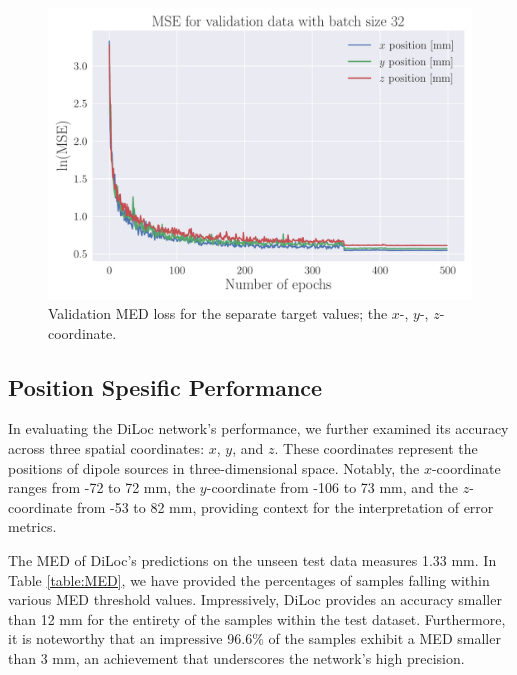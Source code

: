 \documentclass[a4paper, UKenglish, 11pt]{uiomaster}
\begin{document}
\begin{figure}[!htb]
    \centering
    \includegraphics[width=\linewidth]{figures/mse_targets_simple_32_0.001_0.35_0.5_0.0_500_(0).pdf}
    \caption{Validation MED loss for the separate target values; the $x$-, $y$-, $z$-coordinate.}
    \label{fig:single_dipole_accuracy_targets}
\end{figure}


\subsection{Position Spesific Performance}
In evaluating the DiLoc network's performance, we further examined its accuracy across three spatial coordinates: $x$, $y$, and $z$. These coordinates represent the positions of dipole sources in three-dimensional space. Notably, the $x$-coordinate ranges from -72 to 72 mm, the $y$-coordinate from -106 to 73 mm, and the $z$-coordinate from -53 to 82 mm, providing context for the interpretation of error metrics.

The MED of DiLoc's predictions on the unseen test data measures 1.33 mm. In Table \ref{table:MED}, we have provided the percentages of samples falling within various MED threshold values. Impressively, DiLoc provides an accuracy smaller than 12 mm for the entirety of the samples within the test dataset. Furthermore, it is noteworthy that an impressive 96.6$\%$ of the samples exhibit a MED smaller than 3 mm, an achievement that underscores the network's high precision.
\end{document}
